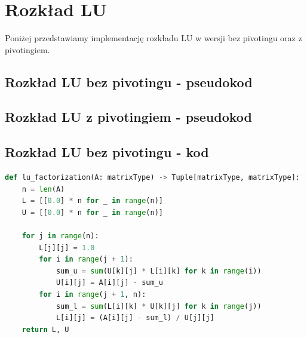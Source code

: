 \documentclass[a4paper]{article}
\begin{document}
\section{Rozkład LU}
Poniżej przedstawiamy implementację rozkładu LU w wersji bez pivotingu oraz z pivotingiem.

\subsection{Rozkład LU bez pivotingu - pseudokod}

\subsection{Rozkład LU z pivotingiem - pseudokod}

\subsection{Rozkład LU bez pivotingu - kod}
\begin{lstlisting}[language=python]
def lu_factorization(A: matrixType) -> Tuple[matrixType, matrixType]:
    n = len(A)
    L = [[0.0] * n for _ in range(n)]
    U = [[0.0] * n for _ in range(n)]

    for j in range(n):
        L[j][j] = 1.0
        for i in range(j + 1):
            sum_u = sum(U[k][j] * L[i][k] for k in range(i))
            U[i][j] = A[i][j] - sum_u
        for i in range(j + 1, n):
            sum_l = sum(L[i][k] * U[k][j] for k in range(j))
            L[i][j] = (A[i][j] - sum_l) / U[j][j]
    return L, U

\end{lstlisting}
\end{document}
